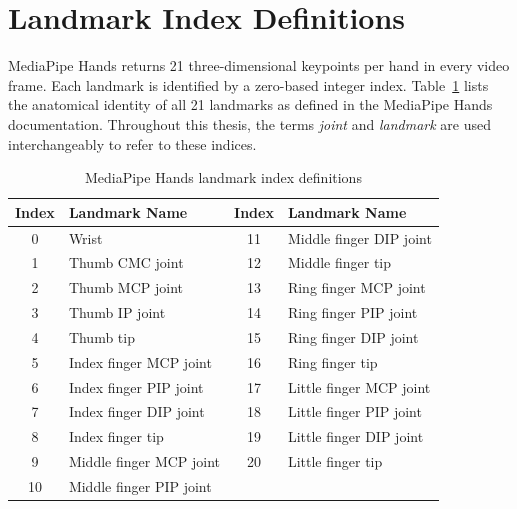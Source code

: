 

\section{Landmark Index Definitions}

MediaPipe Hands returns 21 three-dimensional keypoints per hand in every video frame. Each landmark is identified by a zero-based integer index. Table~\ref{tab:mediapipe_landmarks} lists the anatomical identity of all 21 landmarks as defined in the MediaPipe Hands documentation. Throughout this thesis, the terms \emph{joint} and \emph{landmark} are used interchangeably to refer to these indices.

\begin{table}[H]
  \centering
  \caption{MediaPipe Hands landmark index definitions}
  \label{tab:mediapipe_landmarks}
  \small
  \setlength{\tabcolsep}{10pt}
  \begin{tabularx}{\linewidth}{c >{\raggedright\arraybackslash}X c >{\raggedright\arraybackslash}X}
    \hline
    Index & Landmark Name & Index & Landmark Name \\
    \hline
    0  & Wrist                    & 11 & Middle finger DIP joint  \\
    1  & Thumb CMC joint          & 12 & Middle finger tip        \\
    2  & Thumb MCP joint          & 13 & Ring finger MCP joint    \\
    3  & Thumb IP joint           & 14 & Ring finger PIP joint    \\
    4  & Thumb tip                & 15 & Ring finger DIP joint    \\
    5  & Index finger MCP joint   & 16 & Ring finger tip          \\
    6  & Index finger PIP joint   & 17 & Little finger MCP joint  \\
    7  & Index finger DIP joint   & 18 & Little finger PIP joint  \\
    8  & Index finger tip         & 19 & Little finger DIP joint  \\
    9  & Middle finger MCP joint  & 20 & Little finger tip        \\
    10 & Middle finger PIP joint  &    &                          \\
    \hline
  \end{tabularx}
\end{table}

